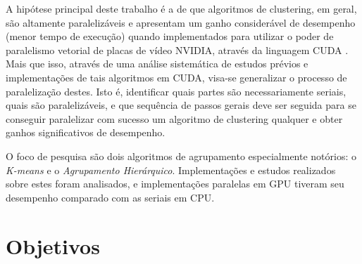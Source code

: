 \documentclass[12pt, %
openright, 
oneside, %
a4paper,    %
brazil]{facom-ufu-abntex2}
\def\qntAlgrtm{dois}
\begin{document}

A hipótese principal deste trabalho é a de que algoritmos de clustering, em geral, são altamente paralelizáveis e apresentam um ganho considerável de desempenho (menor tempo de execução) quando implementados para utilizar o poder de paralelismo vetorial de placas de vídeo NVIDIA, através da linguagem CUDA \cite{CUDAZone}. Mais que isso, através de uma análise sistemática de estudos prévios e implementações de tais algoritmos em CUDA, visa-se generalizar o processo de paralelização destes. Isto é, identificar quais partes são necessariamente seriais, quais são paralelizáveis, e que sequência de passos gerais deve ser seguida para se conseguir paralelizar com sucesso um algoritmo de clustering qualquer e obter ganhos significativos de desempenho.



O foco de pesquisa são \qntAlgrtm{} algoritmos de agrupamento especialmente notórios: o \textit{K-means} \cite{GPU-accelerated-K-Means} e o \textit{Agrupamento Hierárquico}. Implementações e estudos realizados sobre estes foram analisados, e implementações paralelas em GPU tiveram seu desempenho comparado com as seriais em CPU.





\section{Objetivos}
\end{document}
